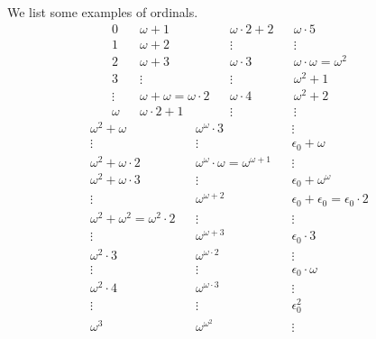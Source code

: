 \documentclass[12pt]{article}
\begin{document}
\begin{exbox}
	We list some examples of ordinals.
	\begin{align*}
		0&  &\omega + 1& &\omega \cdot 2 + 2& &\omega \cdot 5& \\
		1& &\omega + 2& &\vdots& &\vdots& \\
		2& &\omega + 3& &\omega \cdot 3& &\omega \cdot \omega = \omega^2& \\
		3& &\vdots& &\vdots& &\omega^2 + 1& \\
		\vdots& &\omega + \omega = \omega \cdot 2& &\omega \cdot 4& &\omega^2 + 2& \\
		\omega& &\omega \cdot 2 + 1& &\vdots& &\vdots&
	\end{align*}
	\begin{align*}
		\omega^2 + \omega& &\omega^{\omega} \cdot 3& &                                            \vdots& \\
		\vdots& &\vdots& &                                                                        \epsilon_0 + \omega& \\
		\omega^2 + \omega \cdot 2& &\omega^{\omega} \cdot \omega = \omega^{\omega + 1}& &         \vdots& \\
		\omega^2 + \omega \cdot 3& &\vdots& &                                                     \epsilon_0 + \omega^{\omega}& \\
		\vdots& &\omega^{\omega + 2}& &                                                           \epsilon_0 + \epsilon_0 = \epsilon_0 \cdot 2& \\
		\omega^2 + \omega^2 = \omega^2 \cdot 2& &\vdots& &                                        \vdots& \\
		\vdots& &\omega^{\omega + 3}& &                                                           \epsilon_0 \cdot 3& \\
		\omega^2 \cdot 3& &\omega^{\omega \cdot 2}& &                                             \vdots& \\
		\vdots& &\vdots& &                                                                        \epsilon_0 \cdot \omega& \\
		\omega^2 \cdot 4& &\omega^{\omega \cdot 3}& &                                             \vdots& \\
		\vdots& &\vdots& &                                                                        \epsilon_0^2& \\
		\omega^3& &\omega^{\omega^2}& &                                                           \vdots& \\

\end{align*}
\end{exbox}
\end{document}
